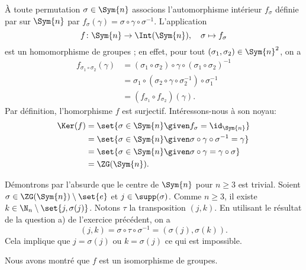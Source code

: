 À toute permutation $\sigma\in\Sym{n}$ associons l'automorphisme intérieur $f_\sigma$ définie par sur $\Sym{n}$ par $f_\sigma(\gamma) = \sigma\circ\gamma\circ\sigma^{-1}$.
L'application
\[
  f\colon\Sym{n}\to\Int(\Sym{n}), \quad \sigma\mapsto f_\sigma
\]
est un homomorphisme de groupes ; en effet, pour tout $(\sigma_1, \sigma_2)\in\Sym{n}^2$, on a
\begin{align*}
  f_{\sigma_1\circ\sigma_2}(\gamma)
    &= (\sigma_1\circ\sigma_2)\circ\gamma\circ(\sigma_1\circ\sigma_2)^{-1} \\
    &= \sigma_1\circ(\sigma_2\circ\gamma\circ\sigma_2^{-1})\circ\sigma_1^{-1} \\
    &= (f_{\sigma_1} \circ f_{\sigma_2})(\gamma).
\end{align*}
Par définition, l'homorphisme $f$ est surjectif.
Intéressons-nous à son noyau:
\begin{align*}
  \Ker(f)
    &= \set{\sigma\in\Sym{n}\given f_{\sigma} = \id_{\Sym{n}}} \\
    &= \set{\sigma\in\Sym{n}\given \sigma\circ\gamma\circ\sigma^{-1} = \gamma} \\
    &= \set{\sigma\in\Sym{n}\given \sigma\circ\gamma = \gamma\circ\sigma} \\
    & = \ZG(\Sym{n}).
\end{align*}

Démontrons par l'absurde que le centre de $\Sym{n}$ pour $n\geq 3$ est trivial.
Soient $\sigma\in\ZG(\Sym{n})\setminus\set{e}$ et $j\in\supp(\sigma)$.
Comme $n\geq 3$, il existe $k\in\N_n\setminus\set{j, \sigma(j)}$.
Notons $\tau$ la transposition $(j, k)$.
En utilisant le résultat de la question a) de l'exercice précédent, on a
\[
  (j, k) = \sigma\circ\tau\circ\sigma^{-1} = (\sigma(j), \sigma(k)).
\]
Cela implique que $j = \sigma(j)$ ou $k = \sigma(j)$ ce qui est impossible.

Nous avons montré que $f$ est un isomorphisme de groupes.
